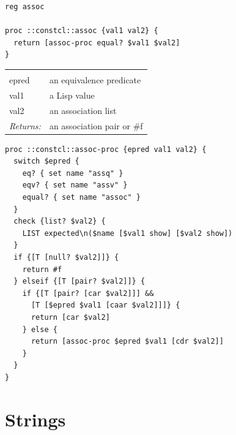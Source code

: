 \documentclass[twoside,9pt]{report}
\begin{document}
\begin{lstlisting}
reg assoc

proc ::constcl::assoc {val1 val2} {
  return [assoc-proc equal? $val1 $val2]
}
\end{lstlisting}
\noindent\begin{tabular}{ |p{1.9cm} p{8cm}| }
\hline
\rowcolor[HTML]{CCCCCC} \multicolumn{2}{|l|}{\bf assoc-proc (internal)} \\
epred & an equivalence predicate \\
val1 & a Lisp value \\
val2 & an association list \\
\textit{Returns:} & an association pair or \#f \\
\hline
\end{tabular}
\begin{lstlisting}
proc ::constcl::assoc-proc {epred val1 val2} {
  switch $epred {
    eq? { set name "assq" }
    eqv? { set name "assv" }
    equal? { set name "assoc" }
  }
  check {list? $val2} {
    LIST expected\n($name [$val1 show] [$val2 show])
  }
  if {[T [null? $val2]]} {
    return #f
  } elseif {[T [pair? $val2]]} {
    if {[T [pair? [car $val2]]] && 
      [T [$epred $val1 [caar $val2]]]} {
      return [car $val2]
    } else {
      return [assoc-proc $epred $val1 [cdr $val2]]
    }
  }
}
\end{lstlisting}
\section{Strings}
\label{strings}
\end{document}
